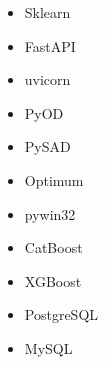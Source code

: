 \documentclass[11pt,a4paper, serif]{moderncv}
\begin{document}
\begin{english}
\begin{cvcolumns}
{\begin{itemize}
	  		\item Sklearn
	  		\item FastAPI
	  		\item uvicorn
	  		\item PyOD
	  		\item PySAD
	  		\item Optimum
	  		\item pywin32
	  		\item CatBoost
	  		\item XGBoost
	  		\item PostgreSQL
	  		\item MySQL
	  	\end{itemize}}
	\end{cvcolumns}
\end{english}
\end{document}
